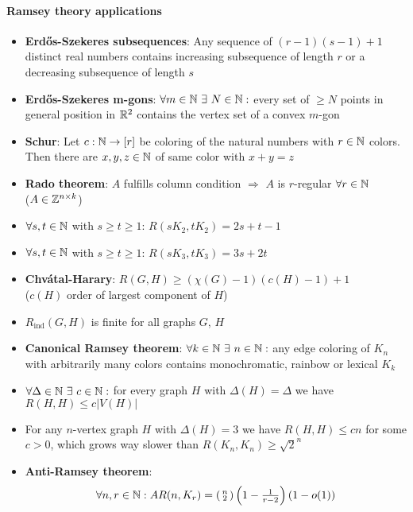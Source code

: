 \paragraph{Ramsey theory applications}
\begin{itemize}
  \item \textbf{Erd\H{o}s-Szekeres subsequences}: Any sequence of \( (r-1)(s-1)+1 \) distinct real numbers contains increasing subsequence of length \( r \) or a decreasing subsequence of length \( s \)
  \item \textbf{Erd\H{o}s-Szekeres m-gons}: \( \forall m \in \mathbb{N} \ \exists \ N \in \mathbb{N} : \) every set of \( \geq N \) points in general position in \( \mathbb{R}^2 \) contains the vertex set of a convex \( m \)-gon
  \item \textbf{Schur}: Let \( c: \mathbb{N} \to [r] \) be coloring of the natural numbers with \( r \in \mathbb{N} \) colors. Then there are \( x,y,z \in \mathbb{N} \) of same color with \( x+y = z \)
  \item \textbf{Rado theorem}: \( A \) fulfills column condition \( \Rightarrow \) \( A \) is \( r \)-regular \( \forall r \in \mathbb{N} \) \\  (\( A \in \mathbb{Z}^{n \times k} \))
  \item \( \forall s,t \in \mathbb{N} \) with \( s \geq t \geq 1 \): \( R(sK_2,tK_2) = 2s+t-1 \)
  \item \( \forall s,t \in \mathbb{N} \) with \( s \geq t \geq 1 \): \( R(sK_3,tK_3) = 3s+2t \)
  \item \textbf{Chvátal-Harary}: \( R(G,H) \geq (\chi(G)-1)(c(H)-1)+1 \) \\ (\( c(H) \) order of largest component of \( H \))
  \item \( R_{\text{ind}}(G,H) \) is finite for all graphs \( G \), \( H \)
  \item \textbf{Canonical Ramsey theorem}: \( \forall k \in \mathbb{N} \ \exists \ n \in \mathbb{N} : \) any edge coloring of \( K_n \) with arbitrarily many colors contains monochromatic, rainbow or lexical \( K_k \)
  \item \( \forall \Delta \in \mathbb{N} \ \exists \ c \in \mathbb{N} : \) for every graph \( H \) with \( \Delta(H) = \Delta \) we have \( R(H,H) \leq c\left\vert V(H) \right\vert \)
  \item For any \( n \)-vertex graph \( H \) with \( \Delta(H) = 3 \) we have \( R(H,H) \leq cn \) for some \( c > 0 \), which grows way slower than \( R(K_n,K_n) \geq \sqrt{2}^n \)
  \item \textbf{Anti-Ramsey theorem}:
  \begin{equation*}
    \forall n,r \in \mathbb{N} : AR(n,K_r) = \left( \begin{smallmatrix}
      n \\ 2
    \end{smallmatrix} \right) \left( 1 - \tfrac{1}{r-2} \right)(1-o(1))
  \end{equation*}
\end{itemize}